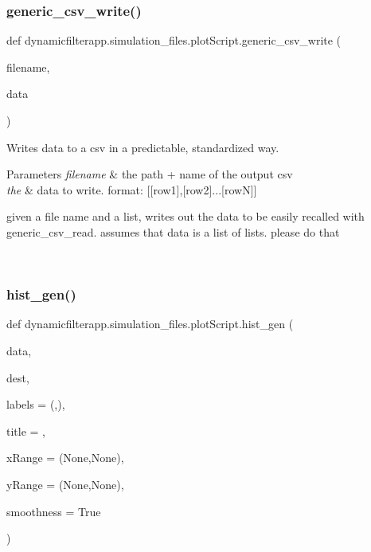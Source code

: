 \subsubsection{\texorpdfstring{generic\_csv\_write()}{generic\_csv\_write()}}
{\footnotesize\ttfamily def dynamicfilterapp.\+simulation\+\_\+files.\+plot\+Script.\+generic\+\_\+csv\+\_\+write (\begin{DoxyParamCaption}\item[{}]{filename,  }\item[{}]{data }\end{DoxyParamCaption})}



Writes data to a csv in a predictable, standardized way. 


\begin{DoxyParams}{Parameters}
{\em filename} & the path + name of the output csv \\
\hline
{\em the} & data to write. format\+: \mbox{[}\mbox{[}row1\mbox{]},\mbox{[}row2\mbox{]}...\mbox{[}rowN\mbox{]}\mbox{]} \begin{DoxyVerb}given a file name and a list, writes out the data to be easily recalled with
generic_csv_read. assumes that data is a list of lists. please do that
\end{DoxyVerb}
 \\
\hline
\end{DoxyParams}
\mbox{\label{namespacedynamicfilterapp_1_1simulation__files_1_1plot_script_adc58c0bae220ebecc2001221654f8b50}} 
\subsubsection{\texorpdfstring{hist\_gen()}{hist\_gen()}}
{\footnotesize\ttfamily def dynamicfilterapp.\+simulation\+\_\+files.\+plot\+Script.\+hist\+\_\+gen (\begin{DoxyParamCaption}\item[{}]{data,  }\item[{}]{dest,  }\item[{}]{labels = {\ttfamily (\textquotesingle{}\textquotesingle{},\textquotesingle{}\textquotesingle{})},  }\item[{}]{title = {\ttfamily \textquotesingle{}\textquotesingle{}},  }\item[{}]{x\+Range = {\ttfamily (None,None)},  }\item[{}]{y\+Range = {\ttfamily (None,None)},  }\item[{}]{smoothness = {\ttfamily True} }\end{DoxyParamCaption})}



